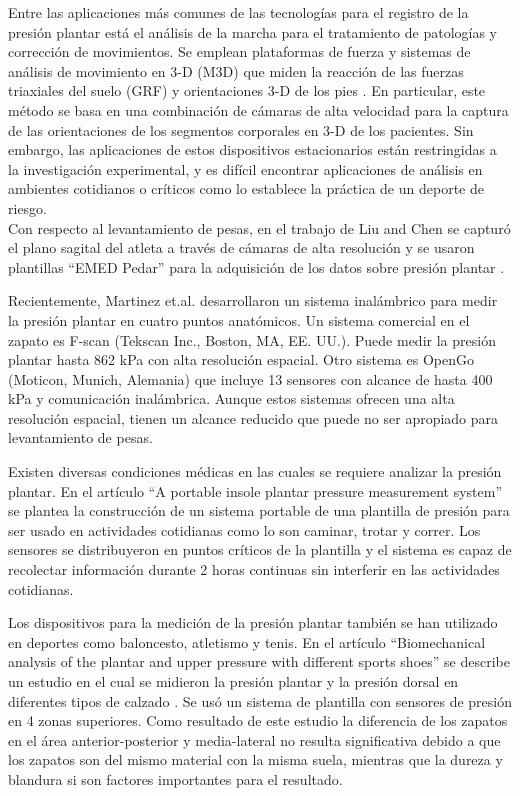 Entre las aplicaciones más comunes de las tecnologías para el registro de la presión plantar está el análisis de la marcha para el tratamiento de patologías y corrección de movimientos. Se emplean plataformas de fuerza y sistemas de análisis de movimiento en 3-D (M3D) que miden la reacción de las fuerzas triaxiales del suelo (GRF) y orientaciones 3-D de los pies \cite{liu2012mobile}. En particular, este método se basa en una combinación de cámaras de alta velocidad para la captura de las orientaciones de los segmentos corporales en 3-D de los pacientes. Sin embargo, las aplicaciones de estos dispositivos estacionarios están restringidas a la investigación experimental, y es difícil encontrar aplicaciones de análisis en ambientes cotidianos o críticos como lo establece la práctica de un deporte de riesgo.\\

Con respecto al levantamiento de pesas, en el trabajo de Liu and Chen se capturó el plano sagital del atleta a través de cámaras de alta resolución y se usaron plantillas “EMED Pedar” para la adquisición de los datos sobre presión plantar \cite{liu2001foot}.

Recientemente, Martinez et.al. \cite{martinez2014embedded} desarrollaron un sistema inalámbrico para medir la presión plantar en cuatro puntos anatómicos. Un sistema comercial en el zapato es F-scan (Tekscan Inc., Boston, MA, EE. UU.). Puede medir la presión plantar hasta 862 kPa con alta resolución espacial. Otro sistema es OpenGo (Moticon, Munich, Alemania) que incluye 13 sensores con alcance de hasta 400 kPa y comunicación inalámbrica. Aunque estos sistemas ofrecen una alta resolución espacial, tienen un alcance reducido que puede no ser apropiado para levantamiento de pesas.

Existen diversas condiciones médicas en las cuales se requiere analizar la presión plantar. En el artículo “A portable insole plantar pressure measurement system” \cite{wertsch1992portable} se plantea la construcción de un sistema portable de una plantilla de presión para ser usado en actividades cotidianas como lo son caminar, trotar y correr. Los sensores se distribuyeron en puntos críticos de la plantilla y el sistema es capaz de recolectar información durante 2 horas continuas sin interferir en las actividades cotidianas.

Los dispositivos para la medición de la presión plantar también se han utilizado en deportes como baloncesto, atletismo y tenis. En el artículo “Biomechanical analysis of the plantar and upper pressure with different sports shoes” se describe un estudio en el cual se midieron la presión plantar y la presión dorsal en diferentes tipos de calzado \cite{mei2014biomechanical}. Se usó un sistema de plantilla con sensores de presión en 4 zonas superiores. Como resultado de este estudio la diferencia de los zapatos en el área anterior-posterior y media-lateral no resulta significativa debido a que los zapatos son del mismo material con la misma suela, mientras que la dureza y blandura si son factores importantes para el resultado.

